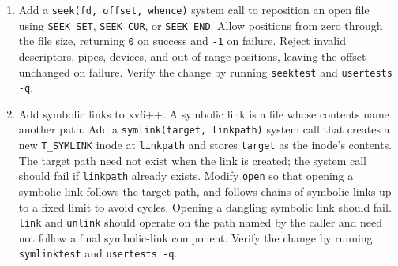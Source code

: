 \begin{enumerate}

\item Add a \lstinline{seek(fd, offset, whence)} system call to reposition
an open file using \lstinline{SEEK_SET}, \lstinline{SEEK_CUR}, or
\lstinline{SEEK_END}. Allow positions from zero through the file size,
returning \lstinline{0} on success and \lstinline{-1} on failure.
Reject invalid descriptors, pipes, devices, and out-of-range positions,
leaving the offset unchanged on failure. Verify the change by running
\texttt{seektest} and \texttt{usertests -q}.

\item Add symbolic links to xv6++. A symbolic link is a file whose
contents name another path. Add a \lstinline{symlink(target, linkpath)}
system call that creates a new \lstinline{T_SYMLINK} inode at
\lstinline{linkpath} and stores \lstinline{target} as the inode's
contents. The target path need not exist when the link is created; the
system call should fail if \lstinline{linkpath} already exists. Modify
\lstinline{open} so that opening a symbolic link follows the target path,
and follows chains of symbolic links up to a fixed limit to avoid cycles.
Opening a dangling symbolic link should fail. \lstinline{link} and
\lstinline{unlink} should operate on the path named by the caller and
need not follow a final symbolic-link component. Verify the change by
running \texttt{symlinktest} and \texttt{usertests -q}.

\end{enumerate}
